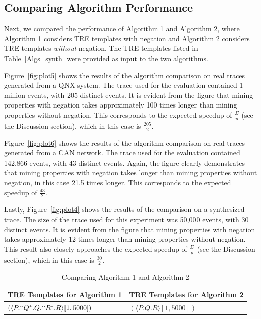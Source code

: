 \documentclass[]{sigplanconf}
\begin{document}
\subsection{Comparing Algorithm Performance}

Next, we compared the performance of Algorithm 1 and Algorithm 2, where Algorithm 1 considers TRE templates with negation and Algorithm 2 considers TRE templates \emph{without} negation. The TRE templates listed in Table~\ref{Algs_synth} were provided as input to the two algorithms.

Figure~\ref{fig:plot5} shows the results of the algorithm comparison on real traces generated from a QNX system. The trace used for the evaluation contained 1 million events, with 205 distinct events. It is evident from the figure that mining properties with negation takes approximately 100 times longer than mining properties without negation. This corresponds to the expected speedup of $\frac{\Sigma}{p}$ (see the Discussion section), which in this case is $\frac{205}{2}$.

Figure~\ref{fig:plot6} shows the results of the algorithm comparison on real traces generated from a CAN network. The trace used for the evaluation contained 142,866 events, with 43 distinct events. Again, the figure clearly demonstrates that mining properties with negation takes longer than mining properties without negation, in this case 21.5 times longer. This corresponds to the expected speedup of $\frac{43}{2}$.

Lastly, Figure~\ref{fig:plot4} shows the results of the comparison on a synthesized trace. The size of the trace used for this experiment was 50,000 events, with 30 distinct events. It is evident from the figure that mining properties with negation takes approximately 12 times longer than mining properties without negation. This result also closely approaches the expected speedup of $\frac{\Sigma}{p}$ (see the Discussion section), which in this case is $\frac{30}{2}$.



\begin{table}[!ht]
	\centering
	\begin{tabular}{|l|l|}
		\hline
		\textbf{TRE Templates for Algorithm 1} & \textbf{TRE Templates for Algorithm 2} \\
		\hline
		 $(\langle P.\verb!^!Q^*.Q.\verb!^!R^*.R \rangle [1, 5000])$& $(\langle P.Q.R \rangle [1, 5000])$ \\
	\end{tabular}

	\caption{Comparing Algorithm 1 and Algorithm 2}
	\label{miningOverhead}
\end{table}
\end{document}
